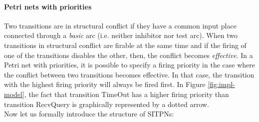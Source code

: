 \documentclass[pdflatex,sn-mathphys]{sn-jnl}%
\theoremstyle{thmstyleone}%
\theoremstyle{thmstyletwo}%
\theoremstyle{thmstylethree}%
\begin{document}
\paragraph{Petri nets with priorities}

Two transitions are in structural conflict if they have a common input
place connected through a \textit{basic} arc (i.e. neither inhibitor
nor test arc). When two transitions in structural conflict are firable
at the same time and if the firing of one of the transitions disables
the other, then, the conflict becomes \textit{effective}. In a Petri
net with priorities, it is possible to specify a firing priority in
the case where the conflict between two transitions becomes
effective. In that case, the transition with the highest firing
priority will always be fired first. In Figure \ref{fig:impl-model},
the fact that transition TimeOut has a higher firing priority than
transition RecvQuery is graphically represented by a dotted arrow. \\

\noindent{}Now let us formally introduce the structure of SITPNs:
\end{document}
